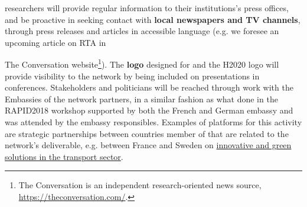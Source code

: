 \acronym researchers will provide regular information to their institutions's press offices, and be proactive in seeking contact with \textbf{local newspapers and TV channels}, through press releases and articles in accessible language (e.g. we foresee an upcoming article on RTA in {The Conversation website\footnote{The Conversation is an independent research-oriented news source, \url{https://theconversation.com/}.}). 
The \textbf{logo} designed for \acronym and the H2020 logo will provide visibility to the network by being included on presentations in conferences.
Stakeholders and politicians will be reached through work with the Embassies of the network partners, in a similar fashion as what done in the RAPID2018 workshop supported by both the French and German embassy and was attended by the embassy responsibles. Examples of platforms for this activity are strategic partnerships between countries member of \acronym that are related to the network's deliverable, e.g. between France and Sweden on \href{https://www.government.se/press-releases/2018/06/french-swedish-strategic-partnership-for-innovation-and-green-solutions-in-the-transport-sector/}{innovative and green solutions in the transport sector}.  


}
